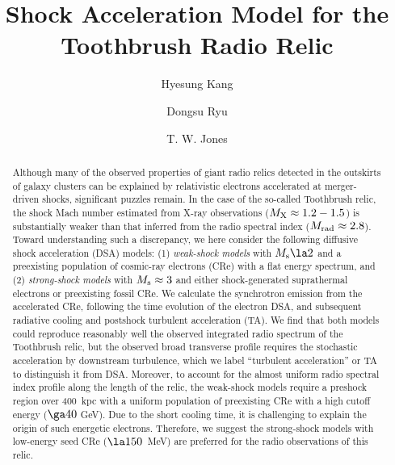 \documentclass[twocolumn]{aastex61}
\begin{document}
\title{Shock Acceleration Model for the Toothbrush Radio Relic}

\author{Hyesung Kang}
\author{Dongsu Ryu}
\author{T. W. Jones}

\begin{abstract}
Although many of the observed properties of giant radio relics detected in the outskirts of galaxy clusters can be 
explained by relativistic electrons accelerated at merger-driven shocks, significant puzzles remain. 
In the case of the so-called Toothbrush relic,
the shock Mach number estimated from X-ray observations ($M_{\rm X}\approx1.2-1.5$) is substantially weaker 
than that inferred from the radio spectral index ($M_{\rm rad}\approx2.8$).
Toward understanding such a discrepancy, we here consider the following diffusive shock acceleration (DSA) models:
(1) {\it weak-shock models} with $M_{\rm s}\la2$ and a preexisting population of cosmic-ray electrons (CRe) 
with a flat energy spectrum,
and (2) {\it strong-shock models} with $M_{\rm s}\approx3$ and either shock-generated suprathermal electrons 
or preexisting fossil CRe.
We calculate the synchrotron emission from the accelerated CRe,
following the time evolution of the electron DSA, and
subsequent radiative cooling and postshock turbulent acceleration (TA). 
We find that both models could reproduce reasonably well the observed integrated radio spectrum of 
the Toothbrush relic,
but the observed broad transverse profile requires the stochastic acceleration by downstream turbulence, which we label ``turbulent acceleration'' or TA to distinguish it from DSA.
Moreover, to account for the almost uniform radio spectral index profile along the length of the relic,
the weak-shock models require a preshock region over 400~kpc with a uniform population of preexisting CRe
with a high cutoff energy ($\ga40$ GeV). Due to the short cooling time, it is challenging to
explain the origin of such energetic electrons. 
Therefore, we suggest the strong-shock models with low-energy seed CRe ($\la150$~MeV)
are preferred for the radio observations of this relic.
\end{abstract}
\end{document}
